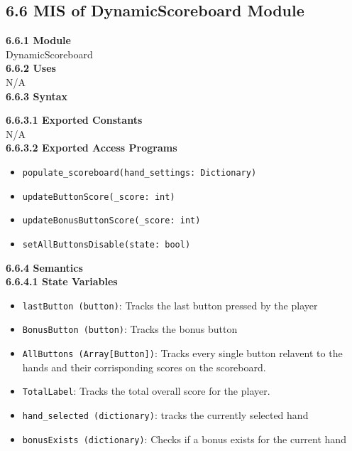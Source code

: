 \documentclass[12pt, titlepage]{article}
\begin{document}
\subsection*{6.6 MIS of DynamicScoreboard Module}
\textbf{6.6.1 Module}\\
 DynamicScoreboard\\

\noindent \textbf{6.6.2 Uses}\\

N/A \\

\noindent \textbf{6.6.3 Syntax}

\noindent \textbf{6.6.3.1 Exported Constants}\\

\noindent N/A\\

\textbf{6.6.3.2 Exported Access Programs}
\begin{itemize}
	\item \texttt{populate\_scoreboard(hand\_settings: Dictionary)}
	\item \texttt{updateButtonScore(\_score: int)}
	\item \texttt{updateBonusButtonScore(\_score: int)}
	\item \texttt{setAllButtonsDisable(state: bool)}
	
	
\end{itemize}

\noindent \textbf{6.6.4 Semantics}\\
\textbf{6.6.4.1 State Variables}\\
\begin{itemize}
	\item \texttt{lastButton (button)}: Tracks the last button pressed by the player
	\item \texttt{BonusButton (button)}: Tracks the bonus button 
	\item \texttt{AllButtons (Array[Button])}: Tracks every single button relavent to the hands and their corrisponding scores on the scoreboard.
	\item \texttt{TotalLabel}: Tracks the total overall score for the player.
	\item \texttt{hand\_selected (dictionary)}: tracks the currently selected hand
	\item \texttt{bonusExists (dictionary)}: Checks if a bonus exists for the current hand

\end{itemize}
\end{document}
